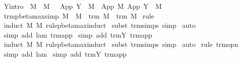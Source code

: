 \begin{isabellebody}
{\isacharbar}\ Y{\isacharbrackleft}intro{\isacharbrackright}{\isacharcolon}\ {\isachardoublequoteopen}{\isasymlbrakk}\ M\ {\isachargreater}{\isachargreater}{\isachargreater}\ M{\isacharprime}\ {\isasymrbrakk}\ {\isasymLongrightarrow}\ App\ {\isacharparenleft}Y\ {\isasymsigma}{\isacharparenright}\ M\ {\isachargreater}{\isachargreater}{\isachargreater}\ App\ M{\isacharprime}\ {\isacharparenleft}App\ {\isacharparenleft}Y\ {\isasymsigma}{\isacharparenright}\ M{\isacharprime}{\isacharparenright}{\isachardoublequoteclose}\isanewline
\isanewline
{}\isamarkupfalse%
\ trm{\isacharunderscore}pbeta{\isacharunderscore}max{\isacharunderscore}simp{}{\isacharcolon}\ {\isachardoublequoteopen}M\ {\isachargreater}{\isachargreater}{\isachargreater}\ M{\isacharprime}\ {\isasymLongrightarrow}\ trm\ M\ {\isasymand}\ trm\ M{\isacharprime}{\isachardoublequoteclose}\isanewline
%
\isadelimproof
%
\endisadelimproof
%
\isatagproof
{}\isamarkupfalse%
\ rule\isanewline
{}\isamarkupfalse%
\ {\isacharparenleft}induct\ M\ M{\isacharprime}\ rule{\isacharcolon}pbeta{\isacharunderscore}max{\isachardot}induct{\isacharparenright}\isanewline
{}\isamarkupfalse%
\ {\isacharparenleft}subst\ trm{\isachardot}simps{\isacharcomma}\ simp{\isacharparenright}{\isacharplus}\isanewline
{}\isamarkupfalse%
\ auto{\isacharbrackleft}{}{\isacharbrackright}\isanewline
{}\isamarkupfalse%
\ {\isacharparenleft}simp\ add{\isacharcolon}\ lam\ trm{\isachardot}app{\isacharparenright}\isanewline
{}\isamarkupfalse%
\ {\isacharparenleft}simp\ add{\isacharcolon}\ trm{\isachardot}Y\ trm{\isachardot}app{\isacharparenright}\isanewline
{}\isamarkupfalse%
\ {\isacharparenleft}induct\ M\ M{\isacharprime}\ rule{\isacharcolon}pbeta{\isacharunderscore}max{\isachardot}induct{\isacharparenright}\isanewline
{}\isamarkupfalse%
\ {\isacharparenleft}subst\ trm{\isachardot}simps{\isacharcomma}\ simp{\isacharparenright}{\isacharplus}\isanewline
{}\isamarkupfalse%
\ auto{\isacharbrackleft}{}{\isacharbrackright}\isanewline
{}\isamarkupfalse%
\ {\isacharparenleft}rule\ trm{\isacharunderscore}opn{\isacharparenright}\isanewline
{}\isamarkupfalse%
\ {\isacharparenleft}simp\ add{\isacharcolon}\ lam{\isacharparenright}\isanewline
{}\isamarkupfalse%
\ {\isacharparenleft}simp\ add{\isacharcolon}\ trm{\isachardot}Y\ trm{\isachardot}app{\isacharparenright}\isanewline
{}\isamarkupfalse%
%
\endisatagproof

\end{isabellebody}
